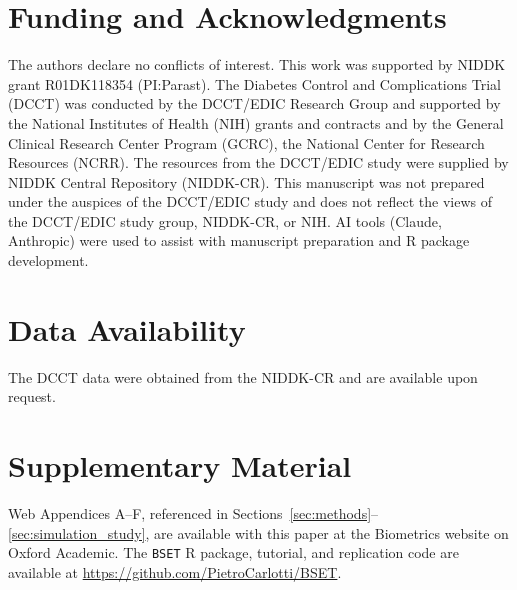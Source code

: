 \documentclass[referee,usenatbib]{biom}
\begin{document}
\backmatter

\section*{Funding and Acknowledgments}

The authors declare no conflicts of interest. This work was supported by NIDDK grant R01DK118354 (PI:Parast). The Diabetes Control and Complications Trial (DCCT) was conducted by the DCCT/EDIC Research Group and supported by the National Institutes of Health (NIH) grants and contracts and by the General Clinical Research Center Program (GCRC), the National Center for Research Resources (NCRR). The resources from the DCCT/EDIC study were supplied by NIDDK Central Repository (NIDDK-CR). This manuscript was not prepared under the auspices of the DCCT/EDIC study and does not reflect the views of the DCCT/EDIC study group, NIDDK-CR, or NIH. AI tools (Claude, Anthropic) were used to assist with manuscript preparation and R package development.

\section*{Data Availability}

The DCCT data were obtained from the NIDDK-CR and are available upon request.




\section*{Supplementary Material}
Web Appendices A--F, referenced in Sections~\ref{sec:methods}--\ref{sec:simulation_study}, are available with this paper at the Biometrics website on Oxford Academic. The \texttt{BSET} R package, tutorial, and replication code are available at \url{https://github.com/PietroCarlotti/BSET}.

\label{lastpage}
\end{document}
